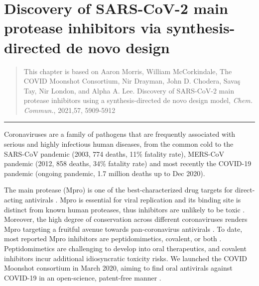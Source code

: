 \chapter{Discovery of SARS-CoV-2 main protease inhibitors via synthesis-directed de novo design} \label{ch:ranking}

\begin{quote}
 This chapter is based on Aaron Morris, William McCorkindale, The COVID Moonshot Consortium, Nir Drayman, John D. Chodera, Savaş Tay, Nir London, and Alpha A. Lee. Discovery of SARS-CoV-2 main protease inhibitors using a synthesis-directed de novo design model, \textit{Chem. Commun.}, 2021,57, 5909-5912 
\end{quote}

\noindent\hfil\rule{0.5\textwidth}{.4pt}\hfil


Coronaviruses are a family of pathogens that are frequently associated with serious and highly infectious human diseases, from the common cold to the SARS-CoV pandemic (2003, 774 deaths, 11\% fatality rate), MERS-CoV pandemic (2012, 858 deaths, 34\% fatality rate) and most recently the COVID-19 pandemic (ongoing pandemic, 1.7 million deaths up to Dec 2020).

The main protease (Mpro) is one of the best-characterized drug targets for direct-acting antivirals \cite{pillaiyar2016overview,cannalire2020targeting}. Mpro is essential for viral replication and its binding site is distinct from known human proteases, thus inhibitors are unlikely to be toxic \cite{jin2020structure,liu2020development}. Moreover, the high degree of conservation across different coronaviruses renders Mpro targeting a fruitful avenue towards pan-coronavirus antivirals \cite{ullrich2020sars}. To date, most reported Mpro inhibitors are peptidomimetics, covalent, or both \cite{cannalire2020targeting}. Peptidomimetics are challenging to develop into oral therapeutics, and covalent inhibitors incur additional idiosyncratic toxicity risks. We launched the COVID Moonshot consortium in March 2020, aiming to find oral antivirals against COVID-19 in an open-science, patent-free manner \cite{chodera2020crowdsourcing}.

